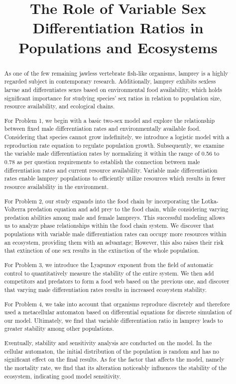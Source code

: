 \documentclass[12pt]{article}  %
\title{The Role of Variable Sex Differentiation Ratios in Populations and Ecosystems}  %
\begin{document}
\begin{abstract}
As one of the few remaining jawless vertebrate fish-like organisms, lamprey is a highly regarded subject in contemporary research. Additionally, lamprey exhibits sexless larvae and differentiates sexes based on environmental food availability, which holds significant importance for studying species' sex ratios in relation to population size, resource availability, and ecological chains.

For Problem 1, we begin with a basic two-sex model and explore the relationship between fixed male differentiation rates and environmentally available food. Considering that species cannot grow indefinitely, we introduce a logistic model with a reproduction rate equation to regulate population growth. Subsequently, we examine the variable male differentiation rates by normalizing it within the range of 0.56 to 0.78 as per question requirements to establish the connection between male differentiation rates and current resource availability. Variable male differentiation rates enable lamprey populations to efficiently utilize resources which results in fewer resource availability in the environment.

For Problem 2, our study expands into the food chain by incorporating the Lotka-Volterra predation equation and add prey to the food chain, while considering varying predation abilities among male and female lampreys. This successful modeling allows us to analyze phase relationships within the food chain system. We discover that populations with variable male differentiation rates can occupy more resources within an ecosystem, providing them with an advantage; However, this also raises their risk that extinction of one sex results in the extinction of the whole population.

For Problem 3, we introduce the Lyapunov exponent from the field of automatic control to quantitatively measure the stability of the entire system. We then add competitors and predators to form a food web based on the previous one, and discover that varying male differentiation rates results in increased ecosystem stability.

For Problem 4, we take into account that organisms reproduce discretely and therefore used a metacellular automaton based on differential equations for discrete simulation of our model. Ultimately, we find that variable differentiation ratio in lamprey leads to greater stability among other populations.

Eventually, stability and sensitivity analysis are conducted on the model. In the cellular automaton, the initial distribution of the population is random and has no significant effect on the final results. As for the factor that affects the model, namely the mortality rate, we find that its alteration noticeably influences the stability of the ecosystem, indicating good model sensitivity.


\end{abstract}
\end{document}
